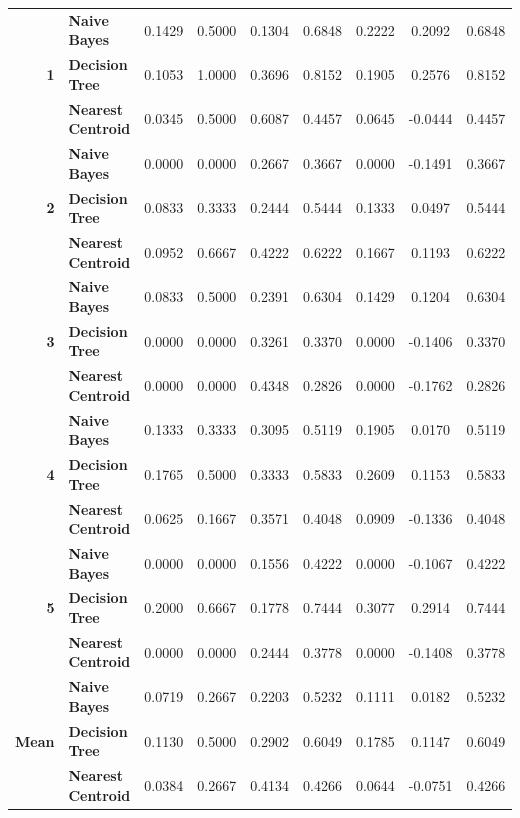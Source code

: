 \begin{center}
\begin{longtable}{ | r  l | c | c | c | c | c | c | c | }
\multirow{3}{*}{\textbf{1}} & \textbf{Naive Bayes} & 
0.1429 & 0.5000 & 0.1304 & 0.6848 & 0.2222 &  0.2092 & 0.6848 \\
& \textbf{Decision Tree} & 
0.1053 & 1.0000 & 0.3696 & 0.8152 & 0.1905 &  0.2576 & 0.8152 \\
& \textbf{Nearest Centroid} &
0.0345 & 0.5000 & 0.6087 & 0.4457 & 0.0645 & -0.0444 & 0.4457 \\
\hline
\multirow{3}{*}{\textbf{2}} & \textbf{Naive Bayes} & 
0.0000 & 0.0000 & 0.2667 & 0.3667 & 0.0000 & -0.1491 & 0.3667 \\
& \textbf{Decision Tree} & 
0.0833 & 0.3333 & 0.2444 & 0.5444 & 0.1333 &  0.0497 & 0.5444 \\
& \textbf{Nearest Centroid} &
0.0952 & 0.6667 & 0.4222 & 0.6222 & 0.1667 &  0.1193 & 0.6222 \\
\hline
\multirow{3}{*}{\textbf{3}} & \textbf{Naive Bayes} & 
0.0833 & 0.5000 & 0.2391 & 0.6304 & 0.1429 &  0.1204 & 0.6304\\
& \textbf{Decision Tree} & 
0.0000 & 0.0000 & 0.3261 & 0.3370 & 0.0000 & -0.1406 & 0.3370 \\
& \textbf{Nearest Centroid} &
0.0000 & 0.0000 & 0.4348 & 0.2826 & 0.0000 & -0.1762 & 0.2826 \\
\hline
\multirow{3}{*}{\textbf{4}} & \textbf{Naive Bayes} & 
0.1333 & 0.3333 & 0.3095 & 0.5119 & 0.1905 &  0.0170 & 0.5119 \\
& \textbf{Decision Tree} & 
0.1765 & 0.5000 & 0.3333 & 0.5833 & 0.2609 &  0.1153 & 0.5833 \\
& \textbf{Nearest Centroid} &
0.0625 & 0.1667 & 0.3571 & 0.4048 & 0.0909 & -0.1336 & 0.4048 \\
\hline
\multirow{3}{*}{\textbf{5}} & \textbf{Naive Bayes} & 
0.0000 & 0.0000 & 0.1556 & 0.4222 & 0.0000 & -0.1067 & 0.4222 \\
& \textbf{Decision Tree} & 
0.2000 & 0.6667 & 0.1778 & 0.7444 & 0.3077 &  0.2914 & 0.7444 \\
& \textbf{Nearest Centroid} &
0.0000 & 0.0000 & 0.2444 & 0.3778 & 0.0000 & -0.1408 & 0.3778 \\
\hline
\multirow{3}{*}{\textbf{Mean}} & \textbf{Naive Bayes} & 
0.0719 & 0.2667 & 0.2203 & 0.5232 & 0.1111 &  0.0182 & 0.5232 \\
& \textbf{Decision Tree} & 
0.1130 & 0.5000 & 0.2902 & 0.6049 & 0.1785 &  0.1147 & 0.6049 \\
& \textbf{Nearest Centroid} &
0.0384 & 0.2667 & 0.4134 & 0.4266 & 0.0644 & -0.0751 & 0.4266 \\
\hline
\end{longtable}
\end{center}

